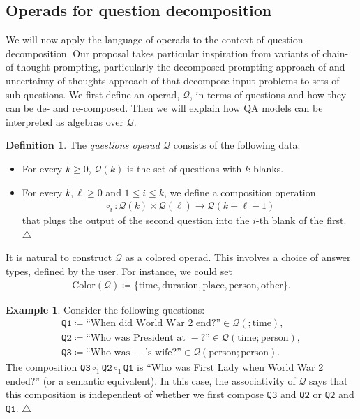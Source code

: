 \documentclass{article}
\theoremstyle{plain}
\theoremstyle{definition}
\newtheorem{definition}[theorem]{Definition}
\theoremstyle{remark}
\theoremstyle{definition}
\newtheorem{example}[theorem]{Example}
\newcommand\cQ{\mathcal{Q}}
\begin{document}
\subsection{Operads for question decomposition}

We will now apply the language of operads to the context of question decomposition.
Our proposal takes particular inspiration from variants of chain-of-thought prompting, particularly the decomposed prompting approach of \citet{khot2022decomposed} and uncertainty of thoughts approach of \citet{hu2024uncertainty} that decompose input problems to sets of sub-questions.
We first define an operad, $\cQ$, in terms of questions and how they can be de- and re-composed.
Then we will explain how QA models can be interpreted as algebras over $\cQ$.

\begin{definition}
\label{def:Q_sketch}
The \emph{questions operad $\cQ$} consists of the following data:
\begin{itemize}
\item
For every $k \geq 0$, $\cQ(k)$ is the set of questions with $k$ blanks.

\item
For every $k, \ell \geq 0$ and $1 \leq i \leq k$, we define a composition operation
\begin{align}
\circ_i\colon \cQ(k)\times \cQ(\ell) \to \cQ(k+\ell-1)
\end{align}
that plugs the output of the second question into the $i$-th blank of the first.
\null\hfill$\triangle$
\end{itemize}
\end{definition}

It is natural to construct $\cQ$ as a colored operad.
This involves a choice of answer types, defined by the user.
For instance, we could set
\begin{align*}
\mathrm{Color}(\cQ)
\coloneqq
\{\text{time},\text{duration},\text{place},\text{person},\text{other}\}.
\end{align*}

\begin{example}
\label{ex:WW2}
Consider the following questions:
\begin{gather*}
\mathtt{Q1} \coloneqq \text{``When did World War 2 end?''} \in \cQ(;\text{time}), \\
\mathtt{Q2} \coloneqq \text{``Who was President at } -\text{?''} \in \cQ(\text{time};\text{person}), \\
\mathtt{Q3} \coloneqq \text{``Who was } -\text{'s wife?''} \in \cQ(\text{person};\text{person}).
\end{gather*}
The composition $\mathtt{Q3}\circ_1\mathtt{Q2}\circ_1\mathtt{Q1}$ is ``Who was First Lady when World War 2 ended?'' (or a semantic equivalent).
In this case, the associativity of $\cQ$ says that this composition is independent of whether we first compose $\mathtt{Q3}$ and $\mathtt{Q2}$ or $\mathtt{Q2}$ and $\mathtt{Q1}$.
\null\hfill$\triangle$
\end{example}
\end{document}
